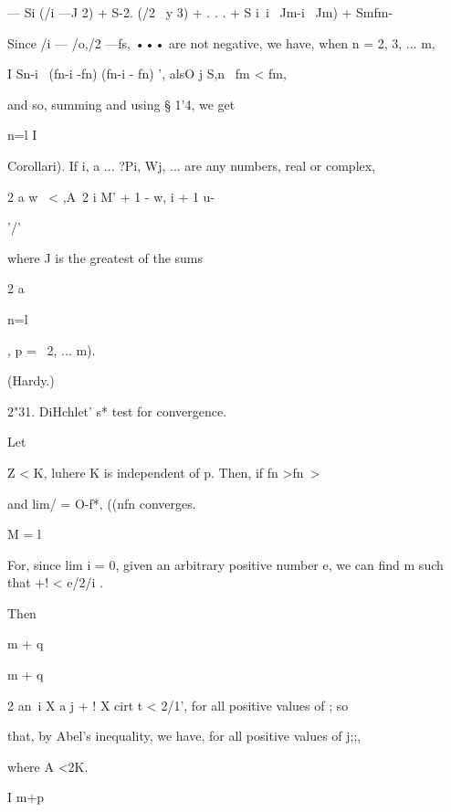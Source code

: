 — Si (/i —J 2) + S-2. (/2 ~y 3) + . . . + S i\ i \ Jm-i ~Jm) + Smfm- 

Since /i — /o,/2 —fs, ••• are not negative, we have, when n = 2, 3, ... m, 

I Sn-i \ (fn-i -fn)   (fn-i - fn) ', alsO j S,n \ fm <  fm, 

and so, summing and using § 1'4, we get 

n=l I 

Corollari). If  i, a  ... ?Pi, Wj, ... are any numbers, real or complex, 



2 a w  \ < ,A\ 2 i M'  + 1 - w,  i + 1 u-  



'/' 



where J is the greatest of the sums 



2 a  

n=l 



,  p = \, 2, ... m). 



(Hardy.) 



2"31. DiHchlet' s* test for convergence. 



Let 



Z    < K, luhere K is independent of p. Then, if fn >fn\-\ > 



and lim/  = O-f*,   ((nfn converges. 

M = l 

For, since lim i = 0, given an arbitrary positive number e, we can find m 
such that   +! < e/2/i . 



Then 



m + q 



m + q 



2 an\  i X a  j + ! X cirt t < 2/1', for all positive values of   ; so 



that, by Abel's inequality, we have, for all positive values of j;;, 



where A <2K. 

I m+p 

